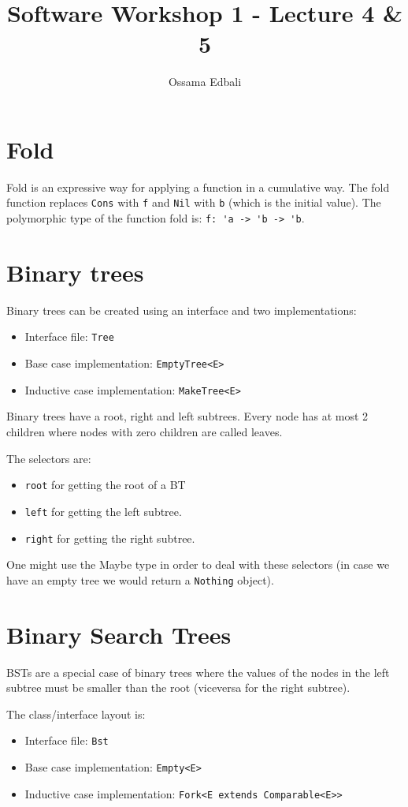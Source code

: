 \documentclass{article}
\title{Software Workshop 1 - Lecture 4 \& 5}
\author{Ossama Edbali}
\begin{document}
	
	\maketitle
	
	\section{Fold}	
	Fold is an expressive way for applying a function in a cumulative way.
	The fold function replaces \verb|Cons|	with \verb|f| and \verb|Nil| with \verb|b| (which is the
	initial value). The polymorphic type of the function fold is: \verb|f: 'a -> 'b -> 'b|.
	
	\section{Binary trees}	
	Binary trees can be created using an interface and two implementations:
	\begin{itemize}
		\item Interface file: \verb|Tree|
		\item Base case implementation: \verb|EmptyTree<E>|
		\item Inductive case implementation: \verb|MakeTree<E>|
	\end{itemize}
	
	Binary trees have a root, right and left subtrees. Every node has at most 2 children where nodes
	with zero children are called leaves.	
	
	The selectors are:
	\begin{itemize}
		\item \verb|root| for getting the root of a BT
		\item \verb|left| for getting the left subtree.
		\item \verb|right| for getting the right subtree.
	\end{itemize}
	
	One might use the Maybe type in order to deal with these selectors (in case we have an empty tree we
	would return a \verb|Nothing| object).
	
	\section{Binary Search  Trees}	
	BSTs are a special case of binary trees where the values of the nodes in the left subtree must be smaller
	than the root (viceversa for the right subtree).
	
	The class/interface layout is:
	\begin{itemize}
		\item Interface file: \verb|Bst|
		\item Base case implementation: \verb|Empty<E>|
		\item Inductive case implementation: \verb|Fork<E extends Comparable<E>>| 
	\end{itemize}
	
\end{document}
